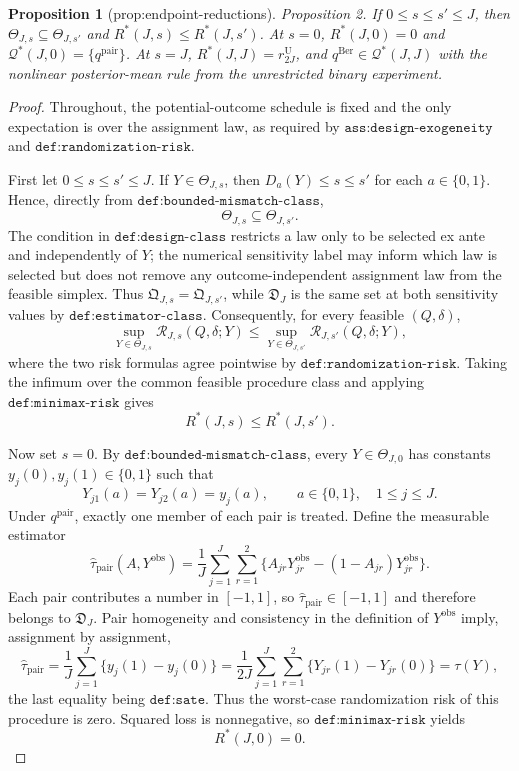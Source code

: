 \documentclass{article}
\newtheorem{proposition}{Proposition}
\begin{document}
\begin{proposition}[prop:endpoint-reductions]\label{prop:endpoint-reductions}
Proposition 2. If \(0\le s\le s'\le J\), then \(\Theta_{J,s}\subseteq\Theta_{J,s'}\) and \(R^*(J,s)\le R^*(J,s')\). At \(s=0\), \(R^*(J,0)=0\) and \(\mathcal Q^*(J,0)=\{q^{\mathrm{pair}}\}\). At \(s=J\), \(R^*(J,J)=r^{\mathrm U}_{2J}\), and \(q^{\mathrm{Ber}}\in\mathcal Q^*(J,J)\) with the nonlinear posterior-mean rule from the unrestricted binary experiment.
\end{proposition}
\begin{proof}
Throughout, the potential-outcome schedule is fixed and the only expectation is over the assignment law, as required by \(\texttt{ass:design-exogeneity}\) and \(\texttt{def:randomization-risk}\).

First let \(0\le s\le s'\le J\).  If \(Y\in\Theta_{J,s}\), then \(D_a(Y)\le s\le s'\) for each \(a\in\{0,1\}\).  Hence, directly from \(\texttt{def:bounded-mismatch-class}\),
\[
 \Theta_{J,s}\subseteq\Theta_{J,s'}.
\]
The condition in \(\texttt{def:design-class}\) restricts a law only to be selected ex ante and independently of \(Y\); the numerical sensitivity label may inform which law is selected but does not remove any outcome-independent assignment law from the feasible simplex.  Thus \(\mathfrak Q_{J,s}=\mathfrak Q_{J,s'}\), while \(\mathfrak D_J\) is the same set at both sensitivity values by \(\texttt{def:estimator-class}\).  Consequently, for every feasible \((Q,\delta)\),
\[
 \sup_{Y\in\Theta_{J,s}}\mathcal R_{J,s}(Q,\delta;Y)
 \le
 \sup_{Y\in\Theta_{J,s'}}\mathcal R_{J,s'}(Q,\delta;Y),
\]
where the two risk formulas agree pointwise by \(\texttt{def:randomization-risk}\).  Taking the infimum over the common feasible procedure class and applying \(\texttt{def:minimax-risk}\) gives
\[
 R^*(J,s)\le R^*(J,s').
\]

Now set \(s=0\).  By \(\texttt{def:bounded-mismatch-class}\), every \(Y\in\Theta_{J,0}\) has constants \(y_j(0),y_j(1)\in\{0,1\}\) such that
\[
 Y_{j1}(a)=Y_{j2}(a)=y_j(a),
 \qquad a\in\{0,1\},\quad 1\le j\le J.
\]
Under \(q^{\mathrm{pair}}\), exactly one member of each pair is treated.  Define the measurable estimator
\[
 \widehat\tau_{\mathrm{pair}}(A,Y^{\mathrm{obs}})
 =\frac1J\sum_{j=1}^J\sum_{r=1}^2
 \bigl\{A_{jr}Y^{\mathrm{obs}}_{jr}-(1-A_{jr})Y^{\mathrm{obs}}_{jr}\bigr\}.
\]
Each pair contributes a number in \([-1,1]\), so \(\widehat\tau_{\mathrm{pair}}\in[-1,1]\) and therefore belongs to \(\mathfrak D_J\).  Pair homogeneity and consistency in the definition of \(Y^{\mathrm{obs}}\) imply, assignment by assignment,
\[
 \widehat\tau_{\mathrm{pair}}
 =\frac1J\sum_{j=1}^J\{y_j(1)-y_j(0)\}
 =\frac1{2J}\sum_{j=1}^J\sum_{r=1}^2
 \{Y_{jr}(1)-Y_{jr}(0)\}
 =\tau(Y),
\]
the last equality being \(\texttt{def:sate}\).  Thus the worst-case randomization risk of this procedure is zero.  Squared loss is nonnegative, so \(\texttt{def:minimax-risk}\) yields
\[
 R^*(J,0)=0.
\]


\end{proof}
\end{document}

